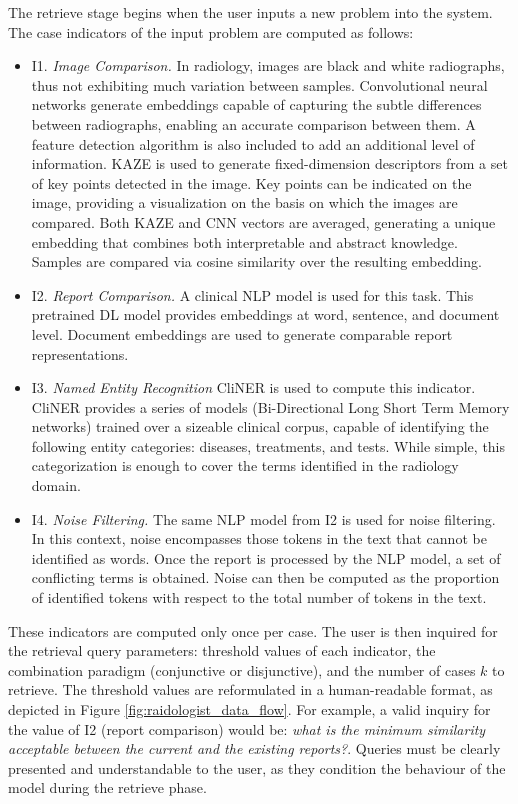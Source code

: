 The retrieve stage begins when the user inputs a new problem into the system. The case indicators of the input problem are computed as follows:

\begin{itemize}
    \item I1. \textit{Image Comparison.} In radiology, images are black and white radiographs, thus not exhibiting much variation between samples. Convolutional neural networks generate embeddings capable of capturing the subtle differences between radiographs, enabling an accurate comparison between them. A feature detection algorithm is also included to add an additional level of information. KAZE is used to generate fixed-dimension descriptors from a set of key points detected in the image. Key points can be indicated on the image, providing a visualization on the basis on which the images are compared. Both KAZE and CNN vectors are averaged, generating a unique embedding that combines both interpretable and abstract knowledge. Samples are compared via cosine similarity over the resulting embedding.
    
    \item I2. \textit{Report Comparison.} A clinical NLP model is used for this task. This pretrained DL model provides embeddings at word, sentence, and document level. Document embeddings are used to generate comparable report representations. 
    
    \item I3. \textit{Named Entity Recognition} CliNER is used to compute this indicator. CliNER provides a series of models (Bi-Directional Long Short Term Memory networks) trained over a sizeable clinical corpus, capable of identifying the following entity categories: diseases, treatments, and tests. While simple, this categorization is enough to cover the terms identified in the radiology domain.
    
    \item I4. \textit{Noise Filtering.} The same NLP model from I2 is used for noise filtering. In this context, noise encompasses those tokens in the text that cannot be identified as words. Once the report is processed by the NLP model, a set of conflicting terms is obtained. Noise can then be computed as the proportion of identified tokens with respect to the total number of tokens in the text.
\end{itemize}

These indicators are computed only once per case. The user is then inquired for the retrieval query parameters: threshold values of each indicator, the combination paradigm (conjunctive or disjunctive), and the number of cases $k$ to retrieve. The threshold values are reformulated in a human-readable format, as depicted in Figure \ref{fig:raidologist_data_flow}. For example, a valid inquiry for the value of I2 (report comparison) would be: \textit{what is the minimum similarity acceptable between the current and the existing reports?}. Queries must be clearly presented and understandable to the user, as they condition the behaviour of the model during the retrieve phase.

